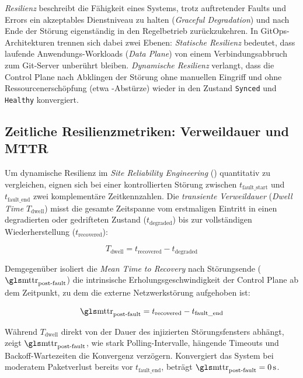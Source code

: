 \textit{Resilienz} beschreibt die Fähigkeit eines Systems, trotz auftretender Faults und Errors ein akzeptables Dienstniveau zu halten (\textit{Graceful Degradation}) und nach Ende der Störung eigenständig in den Regelbetrieb zurückzukehren.\autocite[Kap.~3, S.~23--30]{nygard_release_2018} In GitOps-Architekturen trennen sich dabei zwei Ebenen: \textit{Statische Resilienz} bedeutet, dass laufende Anwendungs-Workloads (\textit{Data Plane}) von einem Verbindungsabbruch zum Git-Server unberührt bleiben. \textit{Dynamische Resilienz} verlangt, dass die Control Plane nach Abklingen der Störung ohne manuellen Eingriff und ohne Ressourcenerschöpfung (etwa -Abstürze) wieder in den Zustand \texttt{Synced} und \texttt{Healthy} konvergiert.

\subsection{Zeitliche Resilienzmetriken: Verweildauer und MTTR}
\label{subsec:zeitliche-resilienzmetriken}

Um dynamische Resilienz im \textit{Site Reliability Engineering} () quantitativ zu vergleichen, eignen sich bei einer kontrollierten Störung zwischen $t_{\text{fault\_start}}$ und $t_{\text{fault\_end}}$ zwei komplementäre Zeitkennzahlen.\autocite[Kap.~22, S.~259--272]{beyer_sre_2016} Die \textit{transiente Verweildauer} (\textit{Dwell Time} $T_{\text{dwell}}$) misst die gesamte Zeitspanne vom erstmaligen Eintritt in einen degradierten oder gedrifteten Zustand ($t_{\text{degraded}}$) bis zur vollständigen Wiederherstellung ($t_{\text{recovered}}$):

\begin{equation}
T_{\text{dwell}} = t_{\text{recovered}} - t_{\text{degraded}}
\label{eq:dwell-time}
\end{equation}

Demgegenüber isoliert die \textit{Mean Time to Recovery} nach Störungsende ($\text{\gl{mttr}}_{\text{post-fault}}$) die intrinsische Erholungsgeschwindigkeit der Control Plane ab dem Zeitpunkt, zu dem die externe Netzwerkstörung aufgehoben ist:

\begin{equation}
\text{\gl{mttr}}_{\text{post-fault}} = t_{\text{recovered}} - t_{\text{fault\_end}}
\label{eq:mttr}
\end{equation}

Während $T_{\text{dwell}}$ direkt von der Dauer des injizierten Störungsfensters abhängt, zeigt $\text{\gl{mttr}}_{\text{post-fault}}$, wie stark Polling-Intervalle, hängende Timeouts und Backoff-Wartezeiten die Konvergenz verzögern. Konvergiert das System bei moderatem Paketverlust bereits vor $t_{\text{fault\_end}}$, beträgt $\text{\gl{mttr}}_{\text{post-fault}} = 0\,\text{s}$.

